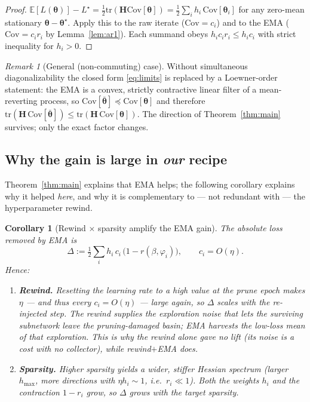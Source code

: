 \documentclass[11pt]{article}
\newtheorem{corollary}{Corollary}
\theoremstyle{remark}
\newtheorem{remark}{Remark}
\newcommand{\E}{\mathbb{E}}
\newcommand{\Cov}{\mathrm{Cov}}
\newcommand{\tr}{\mathrm{tr}}
\newcommand{\Hess}{\bm{H}}
\newcommand{\thetabar}{\bar{\bm\theta}}
\begin{document}
\begin{proof}
$\E[L(\bm\theta)]-L^\star=\tfrac12\tr(\Hess\Cov[\bm\theta])=\tfrac12\sum_i h_i\,\Cov[\bm\theta_i]$
for any zero-mean stationary $\bm\theta-\bm\theta^\star$. Apply this to the raw
iterate ($\Cov=c_i$) and to the EMA ($\Cov=c_i r_i$ by Lemma~\ref{lem:ar1}). Each
summand obeys $h_i c_i r_i\le h_i c_i$ with strict inequality for $h_i>0$.
\end{proof}

\begin{remark}[General (non-commuting) case]
Without simultaneous diagonalizability the closed form
\eqref{eq:limits} is replaced by a Loewner-order statement: the EMA is a
convex, strictly contractive linear filter of a mean-reverting process, so
$\Cov[\thetabar]\preceq\Cov[\bm\theta]$ and therefore
$\tr(\Hess\,\Cov[\thetabar])\le\tr(\Hess\,\Cov[\bm\theta])$. The direction of
Theorem~\ref{thm:main} survives; only the exact factor changes.
\end{remark}

\subsection{Why the gain is large in \emph{our} recipe}

Theorem~\ref{thm:main} explains that EMA helps; the following corollary explains
why it helped \emph{here}, and why it is complementary to --- not redundant with
--- the hyperparameter rewind.

\begin{corollary}[Rewind $\times$ sparsity amplify the EMA gain]
\label{cor:recipe}
The absolute loss removed by EMA is
\begin{equation}
\Delta:=\tfrac12\sum_i h_i\,c_i\,\bigl(1-r(\beta,\varphi_i)\bigr),
\qquad c_i=O(\eta).
\end{equation}
Hence:
\begin{enumerate}
\item[(a)] \textbf{Rewind.} Resetting the learning rate to a high value at the
prune epoch makes $\eta$ --- and thus every $c_i=O(\eta)$ --- large again, so
$\Delta$ scales with the re-injected step. The rewind supplies the exploration
noise that lets the surviving subnetwork leave the pruning-damaged basin; EMA
harvests the low-loss \emph{mean} of that exploration. This is why the rewind
alone gave no lift (its noise is a cost with no collector), while
rewind$+$EMA does.
\item[(b)] \textbf{Sparsity.} Higher sparsity yields a wider, stiffer Hessian
spectrum (larger $h_{\max}$, more directions with $\eta h_i\!\sim\!1$, i.e.\
$r_i\!\ll\!1$). Both the weights $h_i$ and the contraction $1-r_i$ grow, so
$\Delta$ grows with the target sparsity.
\end{enumerate}
\end{corollary}
\end{document}
